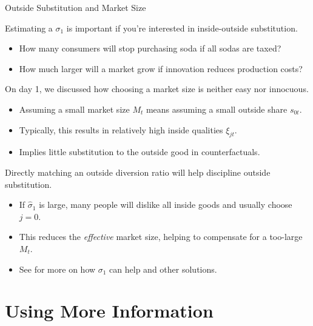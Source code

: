 \documentclass[aspectratio=169,t,11pt,table]{beamer}
\begin{document}
\begin{frame}{Outside Substitution and Market Size}
    \begin{wideitemize}
        \item Estimating a $\sigma_1$ is important if you're interested in inside-outside substitution.
        \begin{itemize}
            \item How many consumers will stop purchasing soda if all sodas are taxed?
            \item How much larger will a market grow if innovation reduces production costs?
        \end{itemize}
        \pause
        \item On day 1, we discussed how choosing a market size is neither easy nor innocuous.
        \begin{itemize}
            \item Assuming a small market size $M_t$ means assuming a small outside share $s_{0t}$.
            \item Typically, this results in relatively high inside qualities $\xi_{jt}$.
            \item Implies little substitution to the outside good in counterfactuals.
        \end{itemize}
        \pause
        \item Directly matching an outside diversion ratio will help discipline outside substitution.
        \begin{itemize}
            \item If $\hat{\sigma}_1$ is large, many people will dislike all inside goods and usually choose $j = 0$.
            \item This reduces the \textit{effective} market size, helping to compensate for a too-large $M_t$.
            \item See \cite{zhang2023identification} for more on how $\sigma_1$ can help and other solutions.
        \end{itemize}
    \end{wideitemize}
\end{frame}

\section{Using More Information}
\end{document}
